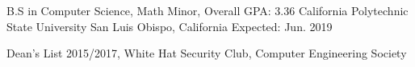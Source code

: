 


\begin{cventries}


\cventry
{B.S in Computer Science, Math Minor, Overall GPA: 3.36} %
{California Polytechnic State University} %
{San Luis Obispo, California} %
{Expected: Jun. 2019} %
{ %
\begin{cvitems}
\item {Dean's List 2015/2017, White Hat Security Club, Computer Engineering Society }
\end{cvitems}
}


\end{cventries}
